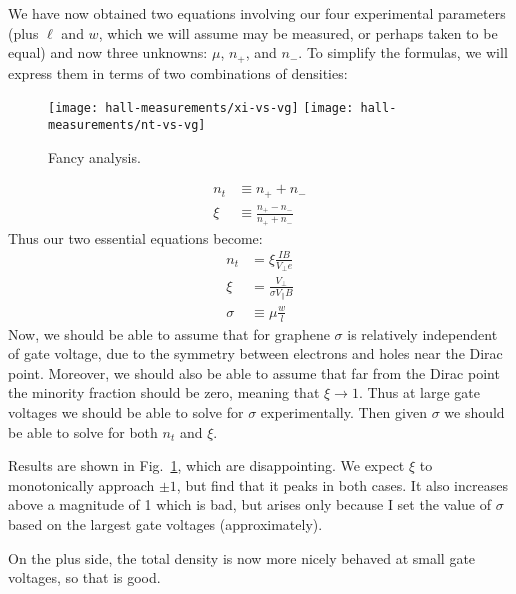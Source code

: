 \documentclass[twocolumn]{revtex4-1}
\begin{document}
We have now obtained two equations involving our four experimental
parameters (plus $\ell$ and $w$, which we will assume may be measured,
or perhaps taken to be equal) and now three unknowns:  $\mu$, $n_+$,
and $n_-$.  To simplify the formulas, we will express them in terms of
two combinations of densities:
\begin{figure}
  \texttt{[image: hall-measurements/xi-vs-vg]}
  \texttt{[image: hall-measurements/nt-vs-vg]}
  \caption{Fancy analysis.}
  \label{fig:nice}
\end{figure}
\begin{align}
  n_t &\equiv n_+ + n_- \\
  \xi &\equiv \frac{n_+ - n_-}{n_+ + n_-}
\end{align}
Thus our two essential equations become:
\begin{align}
  n_t &= \xi\frac{IB}{V_\perp e} \\
  \xi  &= \frac{V_\perp}{\sigma V_\parallel B} \\
  \sigma &\equiv \mu \frac{w}{l}
\end{align}
Now, we should be able to assume that for graphene $\sigma$ is
relatively independent of gate voltage, due to the symmetry between
electrons and holes near the Dirac point.  Moreover, we should also be
able to assume that far from the Dirac point the minority fraction
should be zero, meaning that $\xi \rightarrow 1$.  Thus at large gate
voltages we should be able to solve for $\sigma$ experimentally.  Then
given $\sigma$ we should be able to solve for both $n_t$ and $\xi$.

Results are shown in Fig.~\ref{fig:nice}, which are disappointing.  We
expect $\xi$ to monotonically approach $\pm 1$, but find that it peaks
in both cases.  It also increases above a magnitude of 1 which is bad,
but arises only because I set the value of $\sigma$ based on the
largest gate voltages (approximately).

On the plus side, the total density is now more nicely behaved at
small gate voltages, so that is good.
\end{document}

